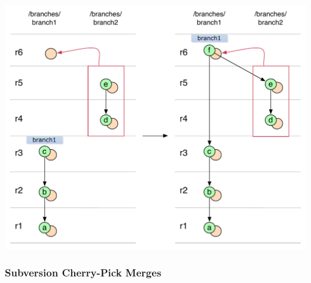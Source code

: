 \begin{center}
\includegraphics[width=\textwidth]{img/diagrams/simple_merge_branch_no_parent_svn_to_git.pdf}%
\label{simple_merge_branch_no_parent_svn_to_git}%
\end{center}

\subsubsection{Subversion Cherry-Pick Merges}

